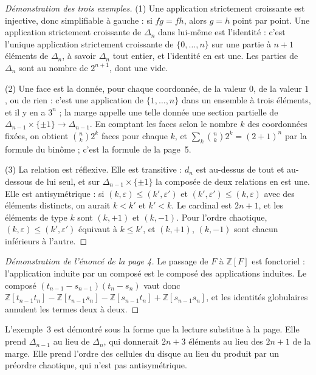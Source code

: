 \begin{proof}[Démonstration des trois exemples]
(1) Une application strictement croissante est injective, donc simplifiable à gauche : si $fg = fh$, alors $g = h$ point par point. Une application strictement croissante de $\Delta_n$ dans lui-même est l'identité : c'est l'unique application strictement croissante de $\{0, \dots, n\}$ sur une partie à $n + 1$ éléments de $\Delta_n$, à savoir $\Delta_n$ tout entier, et l'identité en est une. Les parties de $\Delta_n$ sont au nombre de $2^{n+1}$, dont une vide.

(2) Une face est la donnée, pour chaque coordonnée, de la valeur $0$, de la valeur $1$, ou de rien : c'est une application de $\{1, \dots, n\}$ dans un ensemble à trois éléments, et il y en a $3^n$ ; la marge appelle une telle donnée une section partielle de $\Delta_{n-1} \times \{\pm 1\} \to \Delta_{n-1}$. En comptant les faces selon le nombre $k$ des coordonnées fixées, on obtient $\binom nk 2^k$ faces pour chaque $k$, et $\sum_k \binom nk 2^k = (2 + 1)^n$ par la formule du binôme ; c'est la formule de la page~5.

(3) La relation est réflexive. Elle est transitive : $d_n$ est au-dessus de tout et au-dessous de lui seul, et sur $\Delta_{n-1} \times \{\pm 1\}$ la composée de deux relations  en est une. Elle est antisymétrique : si $(k, \varepsilon) \leq (k', \varepsilon')$ et $(k', \varepsilon') \leq (k, \varepsilon)$ avec des éléments distincts, on aurait $k < k'$ et $k' < k$. Le cardinal est $2n + 1$, et les éléments de type $k$ sont $(k, +1)$ et $(k, -1)$. Pour l'ordre chaotique, $(k, \varepsilon) \leq (k', \varepsilon')$ équivaut à $k \leq k'$, et $(k, +1)$, $(k, -1)$ sont chacun inférieurs à l'autre.
\end{proof}

\begin{proof}[Démonstration de l'énoncé de la page 4]
Le passage de $F$ à $\mathbb Z[F]$ est fonctoriel : l'application induite par un composé est le composé des applications induites. Le composé $(t_{n-1} - s_{n-1})(t_n - s_n)$ vaut donc $\mathbb Z[t_{n-1}t_n] - \mathbb Z[t_{n-1}s_n] - \mathbb Z[s_{n-1}t_n] + \mathbb Z[s_{n-1}s_n]$, et les identités globulaires annulent les termes deux à deux.
\end{proof}

\begin{remarque}
L'exemple~3 est démontré sous la forme que la lecture substitue à la page. Elle prend $\Delta_{n-1}$ au lieu de $\Delta_n$, qui donnerait $2n + 3$ éléments au lieu des $2n + 1$ de la marge. Elle prend l'ordre des cellules du disque au lieu du produit par un préordre chaotique, qui n'est pas antisymétrique.
\end{remarque}

